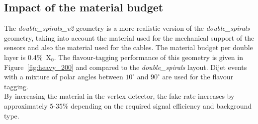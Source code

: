 \subsection{Impact of the material budget}\label{sec:impactOfMaterialBudget}

The {\it double\_spirals\_v2} geometry is a more realistic version of
the {\it double\_spirals} geometry, taking into account the material
used for the mechanical support of the sensors and also the material
used for the cables. The material budget per double layer is 0.4\%~X$_{0}$.
The flavour-tagging performance of this geometry is given in Figure~\ref{fig:heavy_200} and compared to the \textit{double\_spirals} layout. Dijet events
with a mixture of polar angles between $10^{\circ}$ and $90^{\circ}$ are used for the flavour tagging.\\
By increasing the material in the vertex detector, the fake rate increases by approximately 5-35\% depending on the
required signal efficiency and background type.


